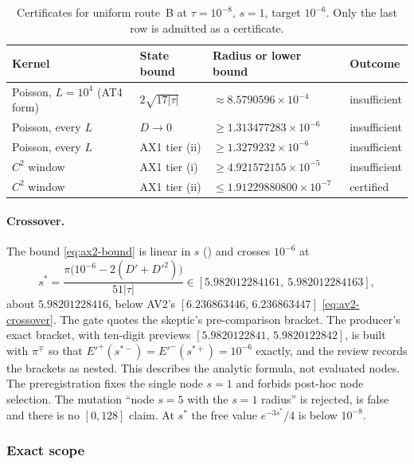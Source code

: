 \begin{table}[htbp]
\centering\small
\caption{Certificates for uniform route~B at $\tau=10^{-8}$, $s=1$, target
$10^{-6}$. Only the last row is admitted as a certificate.}
\label{tab:ax2-failures}
\begin{tabular}{llll}
\toprule
Kernel & State bound & Radius or lower bound & Outcome\\
\midrule
Poisson, $L=10^4$ (AT4 form) & $2\sqrt{17|\tau|}$ &
$\approx8.5790596\times10^{-4}$ & insufficient\\
Poisson, every $L$ & $D\to0$ & $\ge1.313477283\times10^{-6}$ & insufficient\\
Poisson, every $L$ & AX1 tier (ii) & $\ge1.3279232\times10^{-6}$ &
insufficient\\
$C^2$ window & AX1 tier (i) & $\ge4.921572155\times10^{-5}$ &
insufficient\\
$C^2$ window & AX1 tier (ii) & $\le1.91229880800\times10^{-7}$ & certified\\
\bottomrule
\end{tabular}
\end{table}

\paragraph{Crossover.}
The bound \eqref{eq:ax2-bound} is linear in $s$ ()
and crosses $10^{-6}$ at
\begin{equation}
 s^*=\frac{\pi\bigl(10^{-6}-2(D'+D'^2)\bigr)}{51|\tau|}
 \in[5.982012284161,\ 5.982012284163],
 \label{eq:ax2-crossover}
\end{equation}
about $5.98201228416$, below AV2's $[6.236863446,\,6.236863447]$
\eqref{eq:av2-crossover}. The gate quotes the skeptic's pre-comparison
bracket. The producer's exact bracket, with ten-digit previews
$[5.9820122841,\,5.9820122842]$, is built with $\pi^\mp$ so that
$E'^+(s^{*-})=E'^-(s^{*+})=10^{-6}$ exactly, and the review records the
brackets as nested. This describes the analytic formula, not evaluated nodes.
The preregistration fixes the single node $s=1$ and forbids post-hoc node
selection. The mutation ``node $s=5$ with the $s=1$ radius'' is rejected,
 is false and there is no $[0,128]$ claim. At $s^*$ the
free value $e^{-3s^*}/4$ is below $10^{-8}$.

\subsubsection{Exact scope}
\label{sec:ax2-exact}

